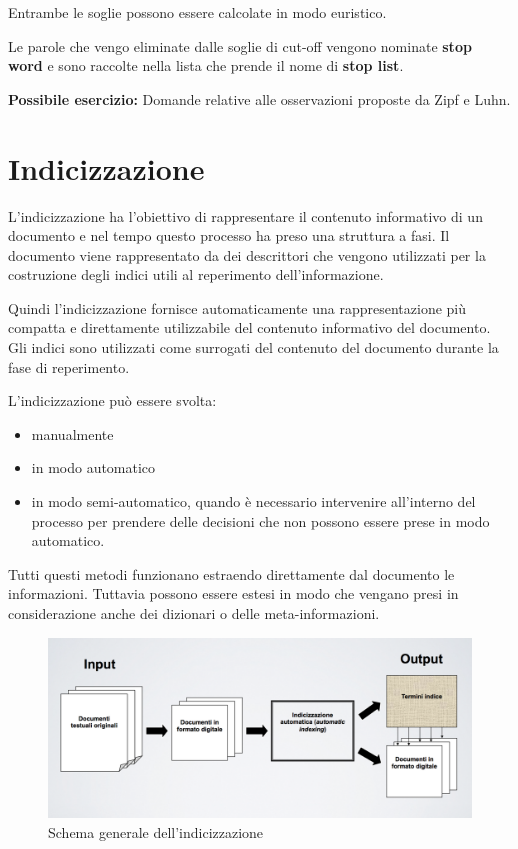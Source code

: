 \noindent Entrambe le soglie possono essere calcolate in modo euristico.

Le parole che vengo eliminate dalle soglie di cut-off vengono nominate \textbf{stop word} e sono raccolte nella lista che prende il nome di \textbf{stop list}.


\textbf{{\color{Red} Possibile esercizio:}} Domande relative alle osservazioni proposte da Zipf e Luhn.

\section{Indicizzazione}

L'indicizzazione ha l'obiettivo di rappresentare il contenuto informativo di un documento e nel tempo questo processo ha preso una struttura a fasi.
Il documento viene rappresentato da dei descrittori che vengono utilizzati per la costruzione degli indici utili al reperimento dell'informazione.

Quindi l'indicizzazione fornisce automaticamente una rappresentazione più compatta e direttamente utilizzabile del contenuto informativo del documento. Gli indici sono utilizzati come surrogati del contenuto del documento durante la fase di reperimento.

L'indicizzazione può essere svolta:
\begin{itemize}
	\item manualmente
	\item in modo automatico
	\item in modo semi-automatico, quando è necessario intervenire all'interno del processo per prendere delle decisioni che non possono essere prese in modo automatico.
\end{itemize}

\noindent Tutti questi metodi funzionano estraendo direttamente dal documento le informazioni. Tuttavia possono essere estesi in modo che vengano presi in considerazione anche dei dizionari o delle meta-informazioni.

\begin{figure}[htbp]
	\centering
	\includegraphics[width=0.7\linewidth]{images/l3-indicizzazione}
	\caption{Schema generale dell'indicizzazione}
\end{figure}

